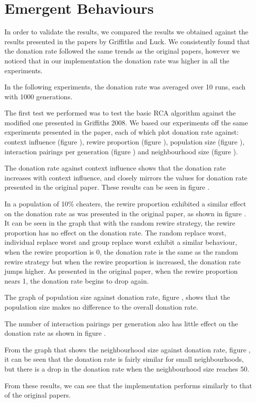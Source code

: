 \section{Emergent Behaviours}

In order to validate the results, we compared the results we obtained against the results presented in the papers by Griffiths and Luck. We consistently found that the donation rate followed the same trends as the original papers, however we noticed that in our implementation the donation rate was higher in all the experiments.

In the following experiments, the donation rate was averaged over 10 runs, each with 1000 generations.

The first test we performed was to test the basic RCA algorithm against the modified one presented in Griffiths 2008. We based our experiments off the same experiments presented in the paper, each of which plot donation rate against: context influence (figure ), rewire proportion (figure ), population size (figure ), interaction pairings per generation (figure ) and neighbourhood size (figure ).

The donation rate against context influence shows that the donation rate increases with context influence, and closely mirrors the values for donation rate presented in the original paper. These results can be seen in figure .

In a population of 10\% cheaters, the rewire proportion exhibited a similar effect on the donation rate as was presented in the original paper, as shown in figure . It can be seen in the graph that with the random rewire strategy, the rewire proportion has no effect on the donation rate. The random replace worst, individual replace worst and group replace worst exhibit a similar behaviour, when the rewire proportion is 0, the donation rate is the same as the random rewire strategy but when the rewire proportion is increased, the donation rate jumps higher. As presented in the original paper, when the rewire proportion nears 1, the donation rate begins to drop again.

The graph of population size against donation rate, figure , shows that the population size makes no difference to the overall donation rate.

The number of interaction pairings per generation also has little effect on the donation rate as shown in figure .

From the graph that shows the neighbourhood size against donation rate, figure , it can be seen that the donation rate is fairly similar for small neighbourhoods, but there is a drop in the donation rate when the neighbourhood size reaches 50.

From these results, we can see that the implementation performs similarly to that of the original papers.